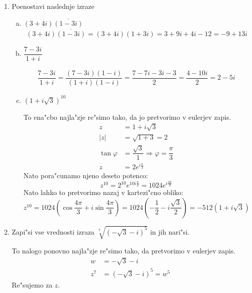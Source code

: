 \documentclass[12pt,a4paper,slovene]{article}
\begin{document}
\begin{enumerate}[(1)]
	\item Poenostavi naslednje izraze
	\begin{enumerate}[(a)]
		\item $(3+4i)\overline{(1-3i)}$
		\begin{multline*}
			(3+4i)\overline{(1-3i)} = (3+4i)(1+3i) = 3 + 9i + 4i - 12 = -9 + 13i
		\end{multline*}
		
		\item $\dfrac{7 - 3i}{1 + i}$
		
		\begin{multline*}
			\dfrac{7-3i}{1+i} = \dfrac{(7-3i)(1-i)}{(1+i)(1-i)} = \dfrac{7 - 7i - 3i - 3}{2} = \dfrac{4 - 10i}{2} = 2 - 5i
		\end{multline*}
		
		\item $(1 + i \sqrt{3})^{10}$
		
		To ena"cbo najla"zje re"simo tako, da jo pretvorimo v eulerjev zapis.
		\begin{align*}
		z & = 1 + i \sqrt{3}\\
		|z| &= \sqrt{1 + 3} = 2 \\
		\tan \varphi &= \dfrac{\sqrt{3}}{1} \Rightarrow \varphi = \dfrac{\pi}{3}\\
		z &= 2e^{i\frac{\pi}{3}}
		\end{align*}
		Nato pora"cunamo njeno deseto potenco:
		\begin{equation*}
		z^{10} = 2^{10}e^{10i\frac{\pi}{3}} = 1024e^{i\frac{4\pi}{3}}
		\end{equation*}
		Nato lahko to pretvorimo nazaj v kartezi"cno obliko:
		\begin{equation*}
		z^{10} = 1024\left(\cos\dfrac{4\pi}{3} + i\sin\dfrac{4\pi}{3}\right) =  1024\left(-\dfrac{1}{2} - i\dfrac{\sqrt{3}}{2}\right) = -512\left(1 + i\sqrt{3}\right)
		\end{equation*}
	\end{enumerate}

	\item Zapi"si vse vrednosti izraza $\sqrt[7]{(-\sqrt{3} - i)^5}$ in jih nari"si.
	
	To nalogo ponovno najla"zje re"simo tako, da pretvorimo v eulerjev zapis.
	\begin{align*}
	w &= -\sqrt{3} - i\\
	z^7 &= (-\sqrt{3} - i)^5 = w^5
	\end{align*}
	Re"sujemo za $z$.
	

\end{enumerate}
\end{document}
